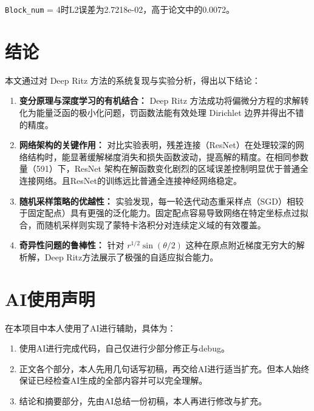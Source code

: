 	\texttt{Block\_num} = 4时L2误差为2.7218e-02，高于论文中的0.0072。
	
	\section{结论}
	本文通过对 Deep Ritz 方法的系统复现与实验分析，得出以下结论：
	
	\begin{enumerate}
		\item \textbf{变分原理与深度学习的有机结合：} Deep Ritz 方法成功将偏微分方程的求解转化为能量泛函的极小化问题，罚函数法能有效处理 Dirichlet 边界并得出不错的精度。
		
		\item \textbf{网络架构的关键作用：} 对比实验表明，残差连接（ResNet）在处理较深的网络结构时，能显著缓解梯度消失和损失函数波动，提高解的精度。在相同参数量（591）下，ResNet 架构在解函数变化剧烈的区域误差控制明显优于普通全连接网络。且ResNet的训练远比普通全连接神经网络稳定。
		
		\item \textbf{随机采样策略的优越性：} 实验发现，每一轮迭代动态重采样点（SGD）相较于固定配点）具有更强的泛化能力。固定配点容易导致网络在特定坐标点过拟合，而随机采样则实现了蒙特卡洛积分对连续定义域的有效覆盖。
		
		\item \textbf{奇异性问题的鲁棒性：} 针对 $r^{1/2} \sin(\theta/2)$ 这种在原点附近梯度无穷大的解析解，Deep Ritz方法展示了极强的自适应拟合能力。
	\end{enumerate}
	
	\section*{AI使用声明}
	在本项目中本人使用了AI进行辅助，具体为：
	\begin{enumerate}
		\item 使用AI进行完成代码，自己仅进行少部分修正与debug。
		\item 正文各个部分，本人先用几句话写初稿，再交给AI进行适当扩充。但本人始终保证已经检查AI生成的全部内容并可以完全理解。
		\item 结论和摘要部分，先由AI总结一份初稿，本人再进行修改与扩充。
	\end{enumerate}




